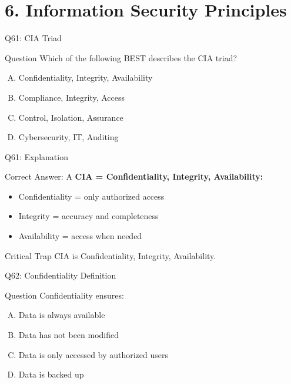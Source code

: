 \documentclass{beamer}
\begin{document}
	\section{6. Information Security Principles}
	
	\begin{frame}{Q61: CIA Triad}
		\begin{block}{Question}
			Which of the following BEST describes the CIA triad?
		\end{block}
		\begin{enumerate}[(A)]
			\item Confidentiality, Integrity, Availability
			\item Compliance, Integrity, Access
			\item Control, Isolation, Assurance
			\item Cybersecurity, IT, Auditing
		\end{enumerate}
	\end{frame}
	
	\begin{frame}{Q61: Explanation}
		\begin{block}{Correct Answer: A}
			\textbf{CIA = Confidentiality, Integrity, Availability:}
			\begin{itemize}
				\item Confidentiality = only authorized access
				\item Integrity = accuracy and completeness
				\item Availability = access when needed
			\end{itemize}
		\end{block}
		\begin{alertblock}{Critical Trap}
			CIA is Confidentiality, Integrity, Availability.
		\end{alertblock}
	\end{frame}
	
	\begin{frame}{Q62: Confidentiality Definition}
		\begin{block}{Question}
			Confidentiality ensures:
		\end{block}
		\begin{enumerate}[(A)]
			\item Data is always available
			\item Data has not been modified
			\item Data is only accessed by authorized users
			\item Data is backed up
		\end{enumerate}
	\end{frame}
	
\end{document}
